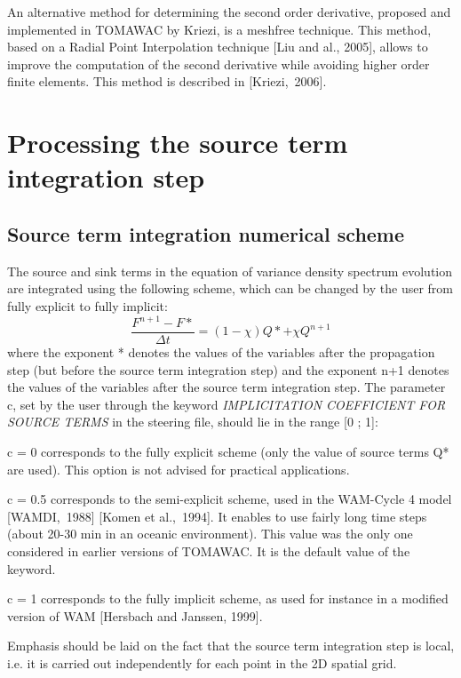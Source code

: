  An alternative method for determining the second order derivative, proposed and implemented in TOMAWAC by Kriezi, is a meshfree technique. This method, based on a Radial Point Interpolation technique [Liu and al., 2005], allows to improve the computation of the second derivative while avoiding higher order finite elements. This method is described in [Kriezi,~2006].




\section{ Processing the source term integration step}


\subsection{ Source term integration numerical scheme }

 The source and sink terms in the equation of variance density spectrum evolution are integrated using the following scheme, which can be changed by the user from fully explicit to fully implicit:
\begin{equation} \label{GrindEQ__6_10_}
\frac{F^{n+1} -F*}{\Delta t} =\left(1-\chi \right)Q*+\chi Q^{n+1}
\end{equation}
where the exponent * denotes the values of the variables after the propagation step (but before the source term integration step) and the exponent n+1 denotes the values of the variables after the source term integration step. The parameter c, set by the user through the keyword \textit{IMPLICITATION COEFFICIENT FOR SOURCE TERMS} in the steering file, should lie in the range [0 ; 1]:

 c = 0 corresponds to the fully explicit scheme (only the value of source terms Q* are used). This option is not advised for practical applications.

 c = 0.5 corresponds to the semi-explicit scheme, used in the WAM-Cycle 4 model [WAMDI,~1988] [Komen et al.,~1994]. It enables to use fairly long time steps (about 20-30 min in an oceanic environment). This value was the only one considered in earlier versions of TOMAWAC. It is the default value of the keyword.

 c = 1 corresponds to the fully implicit scheme, as used for instance in a modified version of WAM [Hersbach and Janssen, 1999].

 Emphasis should be laid on the fact that the source term integration step is local, i.e. it is carried out independently for each point in the 2D spatial grid.

